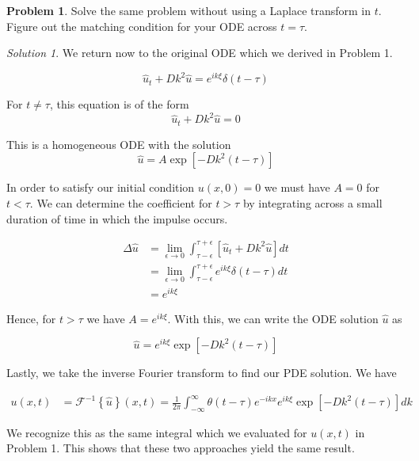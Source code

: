 \documentclass[12pt,a4paper]{article}
\theoremstyle{definition}
\newtheorem{problem}{Problem}
\theoremstyle{remark}
\newtheorem*{solution}{Solution}
\begin{document}
\begin{problem}
    Solve the same problem without using a Laplace transform in $t$. Figure out the matching condition for your ODE across $t=\tau$. 
\end{problem}
\begin{solution}
    We return now to the original ODE which we derived in Problem 1. 

    $$\hat u_t + Dk^2 \hat u = e^{ik \xi} \delta(t-\tau)$$

    For $t \ne \tau$, this equation is of the form $$\hat u_t + Dk^2 \hat u =0$$

    This is a homogeneous ODE with the solution $$\hat u = A \exp \left[ -Dk^2(t-\tau) \right]$$

    In order to satisfy our initial condition $u(x,0)=0$ we must have $A=0$ for $t < \tau$. We can determine the coefficient for $t > \tau$ by integrating across a small duration of time in which the impulse occurs. 

    \begin{align*}
        \Delta \hat u &= \lim_{\epsilon \rightarrow 0} \int_{\tau - \epsilon}^{\tau + \epsilon} \left[\hat u_t + Dk^2 \hat u \right]dt \\
        &= \lim_{\epsilon \rightarrow 0} \int_{\tau - \epsilon}^{\tau + \epsilon} e^{ik \xi} \delta(t-\tau)dt \\
        &= e^{ik \xi}
    \end{align*}

    Hence, for $t > \tau$ we have $A = e^{ik\xi}$. With this, we can write the ODE solution $\hat u$ as

    $$\hat u = e^{ik\xi}\exp\left[ -Dk^2(t-\tau) \right]$$

    Lastly, we take the inverse Fourier transform to find our PDE solution. We have 

    \begin{align*}
        u(x,t) &= \mathcal F^{-1}\left\{ \hat u \right\}(x,t) =  \frac{1}{2 \pi} \int_{-\infty}^\infty \theta(t-\tau) e^{-ikx} e^{ik\xi} \exp\left[ -Dk^2(t-\tau)\right] dk 
    \end{align*}

    We recognize this as the same integral which we evaluated for $u(x,t)$ in Problem 1. This shows that these two approaches yield the same result. 

\end{solution}
\end{document}
